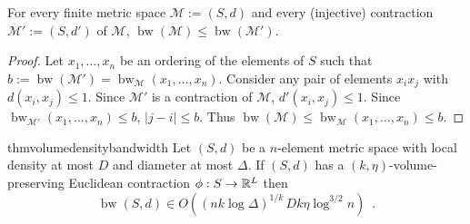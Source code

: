 \documentclass{patmorin}
\renewcommand{\le}{\leqslant}
\DeclareMathOperator{\bw}{bw}
\begin{document}

\begin{obs}\label{contraction_increases_bandwidth}
  For every finite metric space $\mathcal{M}:=(S,d)$ and every (injective) contraction $\mathcal{M}':=(S,d')$ of $\mathcal{M}$, $\bw(\mathcal{M}) \le \bw(\mathcal{M}')$.
\end{obs}

\begin{proof}
  Let $x_1,\ldots,x_n$ be an ordering of the elements of $S$ such that $b:=\bw(\mathcal{M}')=\bw_{\mathcal{M}}(x_1,\ldots,x_n)$. Consider any pair of elements $x_ix_j$ with $d(x_i,x_j) \le 1$. Since $\mathcal{M}'$ is a contraction of $\mathcal{M}$, $d'(x_i,x_j)\le 1$.  Since $\bw_{\mathcal{M}'}(x_1,\ldots,x_n)\le b$, $|j-i|\le b$.  Thus $\bw(\mathcal{M})\le \bw_{\mathcal{M}}(x_1,\ldots,x_n)\le b$.
\end{proof}




\begin{restatable}{thm}{volumedensitybandwidth}\label{volume_density_bandwidth}
  Let $(S,d)$ be a $n$-element metric space with local density at most $D$ and diameter at most $\Delta$.  If $(S,d)$ has a $(k,\eta)$-volume-preserving Euclidean contraction $\phi:S\to\mathbb{R}^L$ then
  \[
    \bw(S,d) \in O((nk\log\Delta)^{1/k}\,Dk\eta\log^{3/2} n) \enspace .
  \]
\end{restatable}
\end{document}
